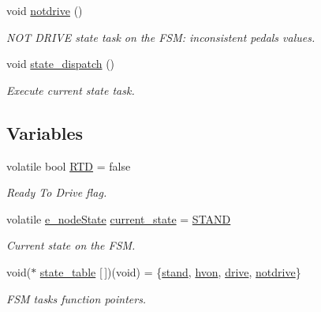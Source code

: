 \begin{DoxyCompactItemize}
void \mbox{\hyperlink{group__stages__group_ga3ac5d1576c7d3ef76c2dfe724d4849fa}{notdrive}} ()
\begin{DoxyCompactList}\small\item\em N\+OT D\+R\+I\+VE state task on the F\+SM\+: inconsistent pedals values. \end{DoxyCompactList}\item 
void \mbox{\hyperlink{group__stages__group_gac534eb879fa26941a06ffadeb69d92ff}{state\+\_\+dispatch}} ()
\begin{DoxyCompactList}\small\item\em Execute current state task. \end{DoxyCompactList}\end{DoxyCompactItemize}
\subsection*{Variables}
\begin{DoxyCompactItemize}
\item 
\mbox{\label{group__stages__group_ga1fd7369abe3c391498e2e8714bf1b2c7}} 
volatile bool \mbox{\hyperlink{group__stages__group_ga1fd7369abe3c391498e2e8714bf1b2c7}{R\+TD}} = false
\begin{DoxyCompactList}\small\item\em Ready To Drive flag. \end{DoxyCompactList}\item 
\mbox{\label{group__stages__group_ga924e56dabe104382db4ee1a3bb507ed9}} 
volatile \mbox{\hyperlink{group__stages__group_ga29e04432d3efcac24a5ae62572a6e8f2}{e\+\_\+node\+State}} \mbox{\hyperlink{group__stages__group_ga924e56dabe104382db4ee1a3bb507ed9}{current\+\_\+state}} = \mbox{\hyperlink{group__stages__group_gga3136d2815abe9d284f985e0a7ec68646af422fb81d42ecd479de08e64b6533d18}{S\+T\+A\+ND}}
\begin{DoxyCompactList}\small\item\em Current state on the F\+SM. \end{DoxyCompactList}\item 
\mbox{\label{group__stages__group_gac6be9d5998378197fc666c4bcb01f3f2}} 
void($\ast$ \mbox{\hyperlink{group__stages__group_gac6be9d5998378197fc666c4bcb01f3f2}{state\+\_\+table}} \mbox{[}$\,$\mbox{]})(void) = \{\mbox{\hyperlink{group__stages__group_ga506140395cba78bffc95d77985780ca5}{stand}}, \mbox{\hyperlink{group__stages__group_ga6fada8f571df828c8fe6b920e2558c37}{hvon}}, \mbox{\hyperlink{group__stages__group_ga928e32686c7e00c1ecde24c3da3019f7}{drive}}, \mbox{\hyperlink{group__stages__group_ga3ac5d1576c7d3ef76c2dfe724d4849fa}{notdrive}}\}
\begin{DoxyCompactList}\small\item\em F\+SM tasks function pointers. \end{DoxyCompactList}\end{DoxyCompactItemize}


